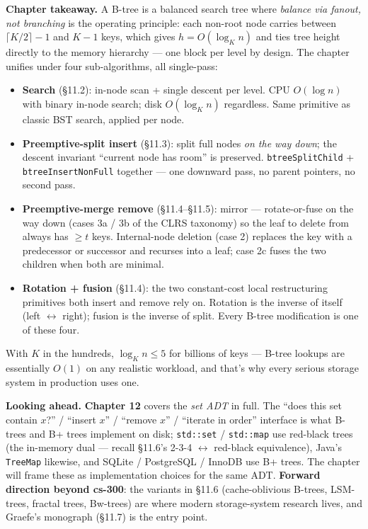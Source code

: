 \documentclass[11pt]{article}
\begin{document}
\begin{ideabox}
\textbf{Chapter takeaway.} A B-tree is a balanced search tree where
\emph{balance via fanout, not branching} is the operating principle:
each non-root node carries between $\lceil K/2 \rceil - 1$ and
$K - 1$ keys, which gives $h = O(\log_K n)$ and ties tree height
directly to the memory hierarchy --- one block per level by design.
The chapter unifies under four sub-algorithms, all single-pass:
\begin{itemize}[leftmargin=*]
    \item \textbf{Search} (\S11.2): in-node scan + single descent
          per level. CPU $O(\log n)$ with binary in-node search;
          disk $O(\log_K n)$ regardless. Same primitive as classic
          BST search, applied per node.
    \item \textbf{Preemptive-split insert} (\S11.3): split full
          nodes \emph{on the way down}; the descent invariant
          ``current node has room'' is preserved.
          \texttt{btreeSplitChild} + \texttt{btreeInsertNonFull}
          together --- one downward pass, no parent pointers, no
          second pass.
    \item \textbf{Preemptive-merge remove} (\S11.4--\S11.5): mirror
          --- rotate-or-fuse on the way down (cases 3a / 3b of the
          CLRS taxonomy) so the leaf to delete from always has
          $\ge t$ keys. Internal-node deletion (case 2) replaces
          the key with a predecessor or successor and recurses
          into a leaf; case 2c fuses the two children when both
          are minimal.
    \item \textbf{Rotation + fusion} (\S11.4): the two
          constant-cost local restructuring primitives both insert
          and remove rely on. Rotation is the inverse of itself
          (left $\leftrightarrow$ right); fusion is the inverse of
          split. Every B-tree modification is one of these four.
\end{itemize}

With $K$ in the hundreds, $\log_K n \le 5$ for billions of keys ---
B-tree lookups are essentially $O(1)$ on any realistic workload, and
that's why every serious storage system in production uses one.

\textbf{Looking ahead.} \textbf{Chapter 12} covers the \emph{set ADT}
in full. The ``does this set contain $x$?'' / ``insert $x$'' /
``remove $x$'' / ``iterate in order'' interface is what B-trees and
B+ trees implement on disk; \texttt{std::set} / \texttt{std::map} use
red-black trees (the in-memory dual --- recall \S11.6's 2-3-4
$\leftrightarrow$ red-black equivalence), Java's \texttt{TreeMap}
likewise, and SQLite / PostgreSQL / InnoDB use B+ trees. The chapter
will frame these as implementation choices for the same ADT.
\textbf{Forward direction beyond cs-300}: the variants in \S11.6
(cache-oblivious B-trees, LSM-trees, fractal trees, Bw-trees) are
where modern storage-system research lives, and Graefe's monograph
(\S11.7) is the entry point.
\end{ideabox}
\end{document}
